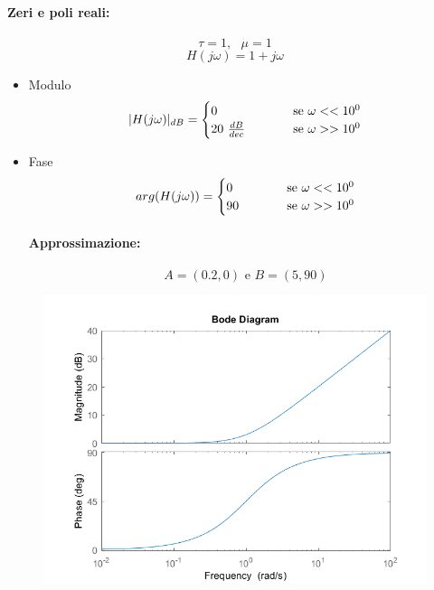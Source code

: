 \documentclass[a4paper]{article}
\begin{document}
	\paragraph{Zeri e poli reali:}
	\[ \tau = 1, \text{ } \mu = 1 \]
	\[ H(j\omega)=1+j\omega \]
	\begin{itemize}
		\item Modulo
			\[
			|H(j\omega)|_{dB} =
				\begin{cases}
				0& \hspace{1.0cm} \text{se } \omega << 10^0 \\
				20 \text{ } \frac{dB}{dec}& \hspace{1.0cm} \text{se } \omega >> 10^0
				\end{cases}
			\]
		\item Fase
			\[
			arg(H(j\omega)) =
				\begin{cases}
				0& \hspace{1.0cm} \text{se } \omega << 10^0 \\
				90& \hspace{1.0cm} \text{se } \omega >> 10^0
				\end{cases}
			\]
			\paragraph{Approssimazione:}
			\[
			A = \left( 0.2, 0 \right) \text{ e } B = \left( 5, 90 \right)
			\]
	\end{itemize}
	\begin{figure}[h]
		\centering
		\includegraphics[scale=0.5]{reali}
		\label{fig:reali}
	\end{figure}
	\newpage
	
\end{document}
